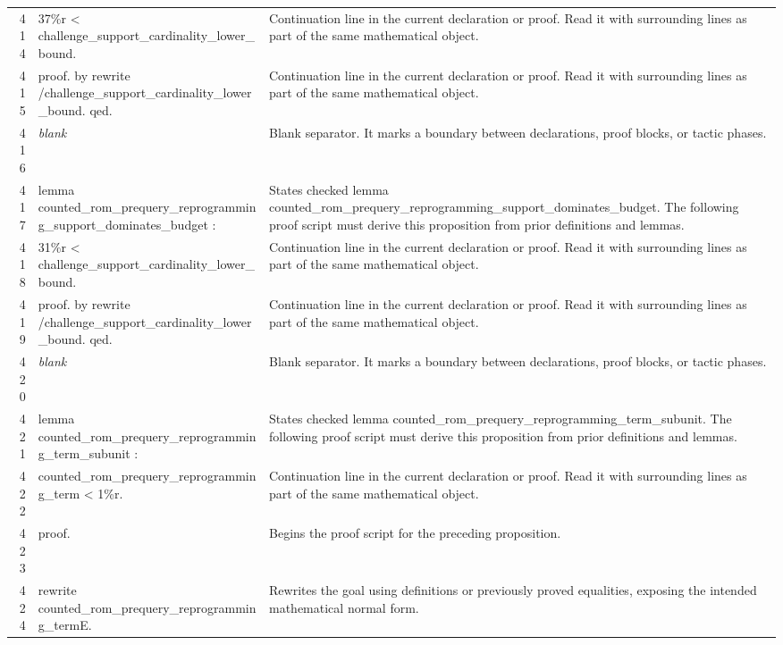 \documentclass[10pt]{article}
\begin{document}
\begin{longtable}{r L{0.53\textwidth} L{0.37\textwidth}}
414 & {\ttfamily\scriptsize   37\%r < challenge\_support\_cardinality\_lower\_bound.} & Continuation line in the current declaration or proof.  Read it with surrounding lines as part of the same mathematical object. \\
415 & {\ttfamily\scriptsize proof. by rewrite /challenge\_support\_cardinality\_lower\_bound. qed.} & Continuation line in the current declaration or proof.  Read it with surrounding lines as part of the same mathematical object. \\
416 & {\ttfamily\scriptsize \emph{blank}} & Blank separator.  It marks a boundary between declarations, proof blocks, or tactic phases. \\
417 & {\ttfamily\scriptsize lemma counted\_rom\_prequery\_reprogramming\_support\_dominates\_budget :} & States checked lemma counted\_rom\_prequery\_reprogramming\_support\_dominates\_budget.  The following proof script must derive this proposition from prior definitions and lemmas. \\
418 & {\ttfamily\scriptsize   31\%r < challenge\_support\_cardinality\_lower\_bound.} & Continuation line in the current declaration or proof.  Read it with surrounding lines as part of the same mathematical object. \\
419 & {\ttfamily\scriptsize proof. by rewrite /challenge\_support\_cardinality\_lower\_bound. qed.} & Continuation line in the current declaration or proof.  Read it with surrounding lines as part of the same mathematical object. \\
420 & {\ttfamily\scriptsize \emph{blank}} & Blank separator.  It marks a boundary between declarations, proof blocks, or tactic phases. \\
421 & {\ttfamily\scriptsize lemma counted\_rom\_prequery\_reprogramming\_term\_subunit :} & States checked lemma counted\_rom\_prequery\_reprogramming\_term\_subunit.  The following proof script must derive this proposition from prior definitions and lemmas. \\
422 & {\ttfamily\scriptsize   counted\_rom\_prequery\_reprogramming\_term < 1\%r.} & Continuation line in the current declaration or proof.  Read it with surrounding lines as part of the same mathematical object. \\
423 & {\ttfamily\scriptsize proof.} & Begins the proof script for the preceding proposition. \\
424 & {\ttfamily\scriptsize rewrite counted\_rom\_prequery\_reprogramming\_termE.} & Rewrites the goal using definitions or previously proved equalities, exposing the intended mathematical normal form. \\

\end{longtable}
\end{document}
